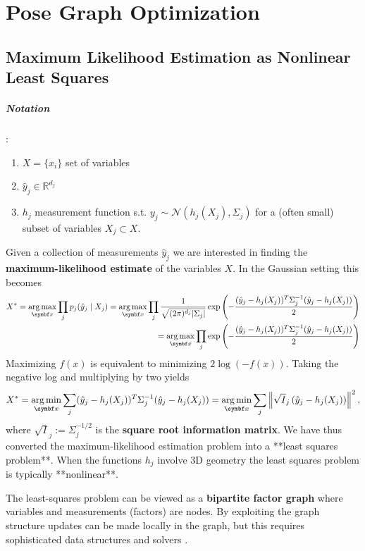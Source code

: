 
\chapter{Pose Graph Optimization}

\section{Maximum Likelihood Estimation as Nonlinear Least Squares}

\paragraph{Notation}:

\begin{enumerate}
  \item $X = \{ x_i \}$ set of variables
  \item $\hat y_j \in \mathbb{R}^{d_j}$
  \item $h_j$ measurement function s.t. $y_j \sim \mathcal N (h_j(X_j), \Sigma_j)$ for a (often small) subset of variables $X_j \subset X$.
\end{enumerate}


Given a collection of measurements $\hat y_j$ we are interested in finding the \textbf{maximum-likelihood estimate} of the variables $X$. In the Gaussian setting this becomes
$$
\begin{aligned}
  X^* = \argmax_{\x} \prod_{j} p_j(\hat y_j \mid X_j) = \argmax_{\x} \prod_j \frac{1}{\sqrt{ (2 \pi)^{d_j} |\Sigma_j|}} \exp \left( - \frac{(\hat y_j - h_j(X_j))^T \Sigma_j^{-1} (\hat y_j - h_j(X_j))}{2} \right) \\
= \argmax_{\x} \prod_j \exp \left( - \frac{(\hat y_j - h_j(X_j))^T \Sigma_j^{-1} (\hat y_j - h_j(X_j))}{2} \right)
\end{aligned}
$$
Maximizing $f(x)$ is equivalent to minimizing $2 \log(-f(x))$. Taking the negative log and multiplying by two yields
$$
  X^* = \argmin_{\x} \sum_j (\hat y_j - h_j(X_j))^T \Sigma_j^{-1} (\hat y_j - h_j(X_j)) = \argmin_{\x} \sum_j \left\| \sqrt{I}_j \left( \hat y_j - h_j(X_j) \right) \right\|^2,
$$
where $\sqrt{I}_j := \Sigma_j^{-1/2}$ is the \textbf{square root information matrix}. We have thus converted the maximum-likelihood estimation problem into a **least squares problem**. When the functions $h_j$  involve 3D geometry the least squares problem is typically **nonlinear**.

The least-squares problem can be viewed as a \textbf{bipartite factor graph} where variables and measurements (factors) are nodes. By exploiting the graph structure updates can be made locally in the graph, but this requires sophisticated data structures and solvers \cite{dellaert_factor_2017}.


